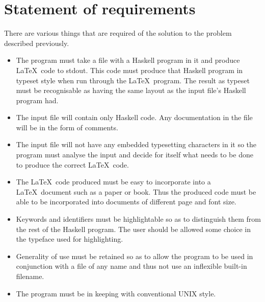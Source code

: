 \section{Statement of requirements}

There are various things that are required of the solution to the
problem described previously.
\begin{itemize}
\item The program must take a file with a Haskell program in it and produce
\LaTeX\ code to stdout.  This code must produce that Haskell program in
typeset style when run through
the \LaTeX\ program.  The result as typeset must be recognisable as having the same
layout as the input file's Haskell program had.

\item The input file will contain only Haskell code.  Any documentation in the file
will be in the form of comments.

\item The input file will not have any embedded typesetting characters in it so
the program must analyse the input and decide for itself what needs to be 
done to produce the correct \LaTeX\ code.

\item The \LaTeX\ code produced must be easy to incorporate into a \LaTeX\
document such as a paper or book.  Thus the produced code must be able 
to be incorporated into documents of different page and font size.

\item Keywords and identifiers must be highlightable so as to distinguish
them from the rest of the Haskell program.
The user should be allowed some choice in the typeface used for
highlighting.

\item Generality of use must be retained so as to allow the program to be used in conjunction
with a file of any name and thus not use an inflexible built-in filename.

\item The program must be in keeping with conventional UNIX style.
\end{itemize}
